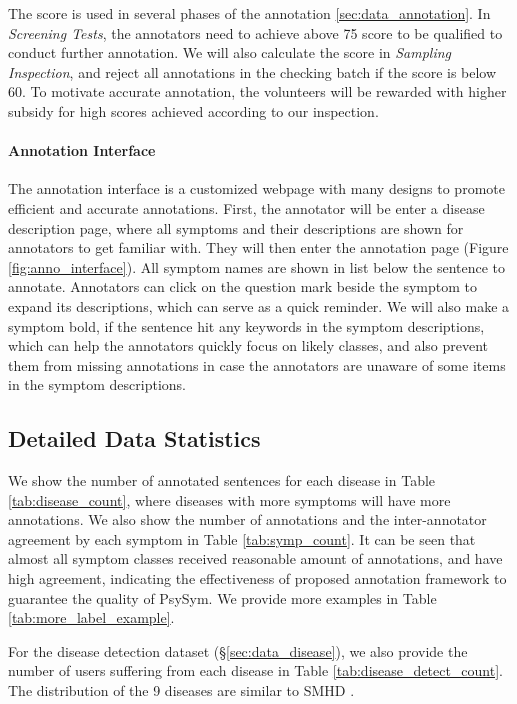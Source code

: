 The score is used in several phases of the annotation \ref{sec:data_annotation}. In \textit{Screening Tests}, the annotators need to achieve above 75 score to be qualified to conduct further annotation. We will also calculate the score in \textit{Sampling Inspection}, and reject all annotations in the checking batch if the score is below 60. To motivate accurate annotation, the volunteers will be rewarded with higher subsidy for high scores achieved according to our inspection.

\paragraph{Annotation Interface} The annotation interface is a customized webpage with many designs to promote efficient and accurate annotations. First, the annotator will be enter a disease description page, where all symptoms and their descriptions are shown for annotators to get familiar with. They will then enter the annotation page (Figure \ref{fig:anno_interface}). All symptom names are shown in list below the sentence to annotate. Annotators can click on the question mark beside the symptom to expand its descriptions, which can serve as a quick reminder. We will also make a symptom bold, if the sentence hit any keywords in the symptom descriptions, which can help the annotators quickly focus on likely classes, and also prevent them from missing annotations in case the annotators are unaware of some items in the symptom descriptions. 

\subsection{Detailed Data Statistics}
\label{apd:stats}

We show the number of annotated sentences for each disease in Table \ref{tab:disease_count}, where diseases with more symptoms will have more annotations. We also show the number of annotations and the inter-annotator agreement by each symptom in Table \ref{tab:symp_count}. It can be seen that almost all symptom classes received reasonable amount of annotations, and have high agreement, indicating the effectiveness of proposed annotation framework to guarantee the quality of PsySym. We provide more examples in Table \ref{tab:more_label_example}.

For the disease detection dataset (\S \ref{sec:data_disease}), we also provide the number of users suffering from each disease in Table \ref{tab:disease_detect_count}. The distribution of the 9 diseases are similar to SMHD \citep{cohan2018smhd}.

